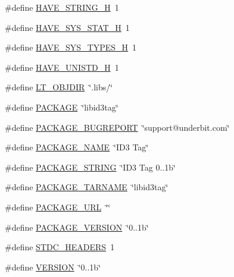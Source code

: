 \begin{DoxyCompactItemize}
\#define \hyperlink{mac_2config_2i386_2lib-src_2libid3tag_2config_8h_ad4c234dd1625255dc626a15886306e7d}{H\+A\+V\+E\+\_\+\+S\+T\+R\+I\+N\+G\+\_\+H}~1
\item 
\#define \hyperlink{mac_2config_2i386_2lib-src_2libid3tag_2config_8h_ace156430ba007d19b4348a950d0c692b}{H\+A\+V\+E\+\_\+\+S\+Y\+S\+\_\+\+S\+T\+A\+T\+\_\+H}~1
\item 
\#define \hyperlink{mac_2config_2i386_2lib-src_2libid3tag_2config_8h_a69dc70bea5d1f8bd2be9740e974fa666}{H\+A\+V\+E\+\_\+\+S\+Y\+S\+\_\+\+T\+Y\+P\+E\+S\+\_\+H}~1
\item 
\#define \hyperlink{mac_2config_2i386_2lib-src_2libid3tag_2config_8h_a219b06937831d0da94d801ab13987639}{H\+A\+V\+E\+\_\+\+U\+N\+I\+S\+T\+D\+\_\+H}~1
\item 
\#define \hyperlink{mac_2config_2i386_2lib-src_2libid3tag_2config_8h_ac2d5925d76379847dd9fc4747b061659}{L\+T\+\_\+\+O\+B\+J\+D\+IR}~\char`\"{}.libs/\char`\"{}
\item 
\#define \hyperlink{mac_2config_2i386_2lib-src_2libid3tag_2config_8h_aca8570fb706c81df371b7f9bc454ae03}{P\+A\+C\+K\+A\+GE}~\char`\"{}libid3tag\char`\"{}
\item 
\#define \hyperlink{mac_2config_2i386_2lib-src_2libid3tag_2config_8h_a1d1d2d7f8d2f95b376954d649ab03233}{P\+A\+C\+K\+A\+G\+E\+\_\+\+B\+U\+G\+R\+E\+P\+O\+RT}~\char`\"{}support@underbit.\+com\char`\"{}
\item 
\#define \hyperlink{mac_2config_2i386_2lib-src_2libid3tag_2config_8h_a1c0439e4355794c09b64274849eb0279}{P\+A\+C\+K\+A\+G\+E\+\_\+\+N\+A\+ME}~\char`\"{}I\+D3 Tag\char`\"{}
\item 
\#define \hyperlink{mac_2config_2i386_2lib-src_2libid3tag_2config_8h_ac73e6f903c16eca7710f92e36e1c6fbf}{P\+A\+C\+K\+A\+G\+E\+\_\+\+S\+T\+R\+I\+NG}~\char`\"{}I\+D3 Tag 0..\+1b\char`\"{}
\item 
\#define \hyperlink{mac_2config_2i386_2lib-src_2libid3tag_2config_8h_af415af6bfede0e8d5453708afe68651c}{P\+A\+C\+K\+A\+G\+E\+\_\+\+T\+A\+R\+N\+A\+ME}~\char`\"{}libid3tag\char`\"{}
\item 
\#define \hyperlink{mac_2config_2i386_2lib-src_2libid3tag_2config_8h_a5c93853116d5a50307b6744f147840aa}{P\+A\+C\+K\+A\+G\+E\+\_\+\+U\+RL}~\char`\"{}\char`\"{}
\item 
\#define \hyperlink{mac_2config_2i386_2lib-src_2libid3tag_2config_8h_aa326a05d5e30f9e9a4bb0b4469d5d0c0}{P\+A\+C\+K\+A\+G\+E\+\_\+\+V\+E\+R\+S\+I\+ON}~\char`\"{}0..\+1b\char`\"{}
\item 
\#define \hyperlink{mac_2config_2i386_2lib-src_2libid3tag_2config_8h_a550e5c272cc3cf3814651721167dcd23}{S\+T\+D\+C\+\_\+\+H\+E\+A\+D\+E\+RS}~1
\item 
\#define \hyperlink{mac_2config_2i386_2lib-src_2libid3tag_2config_8h_a1c6d5de492ac61ad29aec7aa9a436bbf}{V\+E\+R\+S\+I\+ON}~\char`\"{}0..\+1b\char`\"{}
\end{DoxyCompactItemize}


